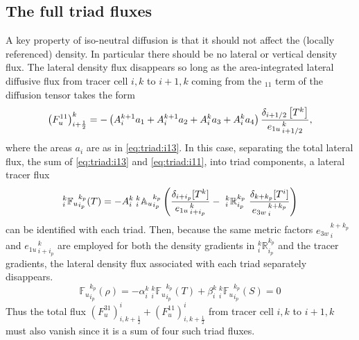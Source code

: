 \subsection{The full triad fluxes}
A key property of iso-neutral diffusion is that it should not affect
the (locally referenced) density. In particular there should be no
lateral or vertical density flux. The lateral density flux disappears so long as the
area-integrated lateral diffusive flux from tracer cell $i,k$ to
$i+1,k$ coming from the $_{11}$ term of the diffusion tensor takes the
form
\begin{equation}
  \label{eq:triad:i11}
  \left( F_u^{11} \right) _{i+\frac{1}{2}} ^{k} =
  - \left( {A}_i^{k+1} a_{1} + {A}_i^{k+1} a_{2} + {A}_i^k
    a_{3} + {A}_i^k a_{4} \right)
  \frac{\delta _{i+1/2} \left[ T^k\right]}{{e_{1u}}_{\,i+1/2}^{\,k}},
\end{equation}
where the areas $a_i$ are as in \eqref{eq:triad:i13}. In this case,
separating the total lateral flux, the sum of \eqref{eq:triad:i13} and
\eqref{eq:triad:i11}, into triad components, a lateral tracer
flux
\begin{equation}
  \label{eq:triad:latflux-triad}
  _i^k {\mathbb{F}_u}_{i_p}^{k_p} (T) = - {A}_i^k{ \:}_i^k{\mathbb{A}_u}_{i_p}^{k_p}
  \left(
    \frac{ \delta_{i+ i_p}[T^k] }{ {e_{1u}}_{\,i + i_p}^{\,k} }
    -\ {_i^k\mathbb{R}_{i_p}^{k_p}} \
    \frac{ \delta_{k+k_p} [T^i] }{{e_{3w}}_{\,i}^{\,k+k_p} }
  \right)
\end{equation}
can be identified with each triad. Then, because the
same metric factors ${e_{3w}}_{\,i}^{\,k+k_p}$ and
${e_{1u}}_{\,i+i_p}^{\,k}$ are employed for both the density gradients
in $ _i^k \mathbb{R}_{i_p}^{k_p}$ and the tracer gradients, the lateral
density flux associated with each triad separately disappears.
\begin{equation}
  \label{eq:triad:latflux-rho}
  {\mathbb{F}_u}_{i_p}^{k_p} (\rho)=-\alpha _i^k {\:}_i^k {\mathbb{F}_u}_{i_p}^{k_p} (T) + \beta_i^k {\:}_i^k {\mathbb{F}_u}_{i_p}^{k_p} (S)=0
\end{equation}
Thus the total flux $\left( F_u^{31} \right) ^i _{i,k+\frac{1}{2}} +
\left( F_u^{11} \right) ^i _{i,k+\frac{1}{2}}$ from tracer cell $i,k$
to $i+1,k$ must also vanish since it is a sum of four such triad fluxes.


